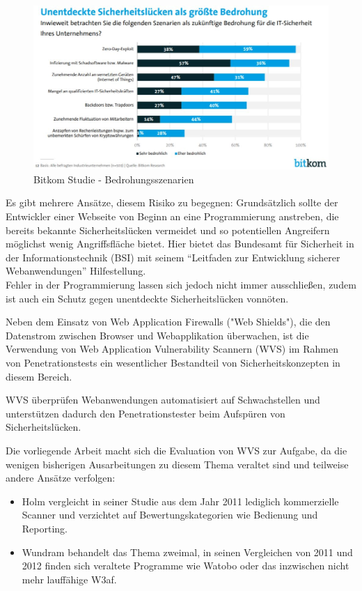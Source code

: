 \documentclass[12pt,oneside,a4paper,parskip]{scrbook}
\begin{document}
\begin{figure}[htb!]
  \centering
   \includegraphics[width=1\textwidth]{Images/Bitkom}
  \caption[Bitkom Studie - Bedrohungsszenarien]{Bitkom Studie - Bedrohungsszenarien \cite{Bitkom}}
\end{figure}
Es gibt mehrere Ansätze, diesem Risiko zu begegnen: Grundsätzlich sollte der Entwickler einer Webseite von Beginn an eine Programmierung anstreben, die bereits bekannte Sicherheitslücken vermeidet und so potentiellen Angreifern möglichst wenig Angriffsfläche bietet. Hier bietet das Bundesamt für Sicherheit in der Informationstechnik (BSI) mit seinem ``Leitfaden zur Entwicklung sicherer Webanwendungen''  \cite{BSI} Hilfestellung.\\
Fehler in der Programmierung lassen sich jedoch nicht immer ausschließen, zudem ist auch ein Schutz gegen unentdeckte Sicherheitslücken vonnöten.

Neben dem Einsatz von Web Application Firewalls ("Web Shields"), die den Datenstrom zwischen Browser und Webapplikation überwachen, ist die Verwendung von Web Application Vulnerability Scannern (WVS) im Rahmen von Penetrationstests ein wesentlicher Bestandteil von Sicherheitskonzepten in diesem Bereich.

WVS überprüfen Webanwendungen automatisiert auf Schwachstellen und unterstützen dadurch den Penetrationstester beim Aufspüren von Sicherheitslücken.

Die vorliegende Arbeit macht sich die Evaluation von WVS zur Aufgabe, da die wenigen bisherigen Ausarbeitungen zu diesem Thema veraltet sind und teilweise andere Ansätze verfolgen:

\begin{itemize}
  \item
  Holm \cite{Holm} vergleicht in seiner Studie aus dem Jahr 2011 lediglich kommerzielle Scanner und verzichtet auf Bewertungskategorien wie Bedienung und Reporting.
  \item
  Wundram \cite{Wundram}\cite{Wundram2} behandelt das Thema zweimal, in seinen Vergleichen von 2011 und 2012 finden sich veraltete Programme wie Watobo oder das inzwischen nicht mehr lauffähige W3af.
\end{itemize}
\end{document}
